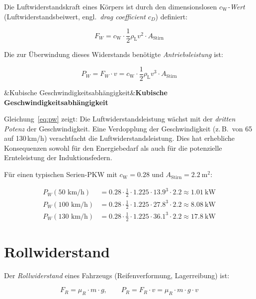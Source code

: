 ﻿\documentclass[12pt, a4paper]{report}
\newenvironment{wichtig}[1][]{%
  \begin{wichtigframe}\sloppy%
  \ifx&#1&\else\textbf{#1}\par\smallskip\fi}{\end{wichtigframe}}
\theoremstyle{definition}
\theoremstyle{remark}
\newcommand{\rhoL}{\rho_{\text{L}}}
\newcommand{\cW}{c_{\text{W}}}
\newcommand{\Astirnfl}{A_{\text{Stirn}}}
\begin{document}
Die Luftwiderstandskraft eines Körpers ist durch den dimensionslosen
\emph{$\cW$-Wert} (Luftwiderstandsbeiwert, engl.\ \emph{drag coefficient}
$c_D$) definiert:

\begin{equation}
  F_W = \cW \cdot \frac{1}{2}\rhoL v^2 \cdot \Astirnfl
  \label{eq:fw}
\end{equation}

Die zur Überwindung dieses Widerstands benötigte \emph{Antriebsleistung} ist:

\begin{equation}
  P_W = F_W \cdot v = \cW \cdot \frac{1}{2}\rhoL v^3 \cdot \Astirnfl
  \label{eq:pw}
\end{equation}

\begin{wichtig}[Kubische Geschwindigkeitsabhängigkeit]
  Gleichung~\eqref{eq:pw} zeigt: Die Luftwiderstandsleistung wächst mit der
  \emph{dritten Potenz} der Geschwindigkeit. Eine Verdopplung der Geschwindigkeit
  (z.\,B.\ von 65 auf 130\,km/h) veracht\-facht die Luftwiderstandsleistung.
  Dies hat erhebliche Konsequenzen sowohl für den Energiebedarf als auch für
  die potenzielle Ernteleistung der Induktionsfedern.
\end{wichtig}

Für einen typischen Serien-PKW mit $\cW = 0.28$ und $\Astirnfl = \SI{2.2}{\metre\squared}$:

\begin{align}
  P_W(50\text{ km/h})  &= 0.28 \cdot \tfrac{1}{2} \cdot 1.225 \cdot 13.9^3 \cdot 2.2 \approx \SI{1.01}{\kilo\watt} \label{eq:pw50}\\
  P_W(100\text{ km/h}) &= 0.28 \cdot \tfrac{1}{2} \cdot 1.225 \cdot 27.8^3 \cdot 2.2 \approx \SI{8.08}{\kilo\watt} \label{eq:pw100}\\
  P_W(130\text{ km/h}) &= 0.28 \cdot \tfrac{1}{2} \cdot 1.225 \cdot 36.1^3 \cdot 2.2 \approx \SI{17.8}{\kilo\watt} \label{eq:pw130}
\end{align}

\section{Rollwiderstand}

Der \emph{Rollwiderstand} eines Fahrzeugs (Reifenverformung, Lagerreibung) ist:

\begin{equation}
  F_R = \mu_R \cdot m \cdot g, \qquad P_R = F_R \cdot v = \mu_R \cdot m \cdot g \cdot v
  \label{eq:roll}
\end{equation}
\end{document}
